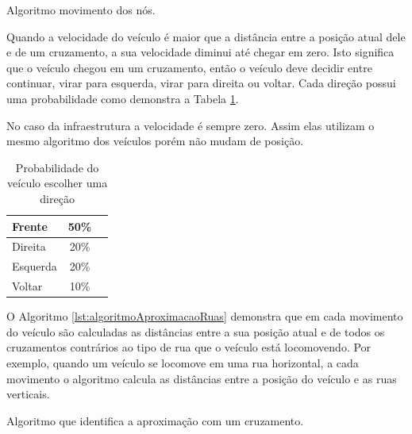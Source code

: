 \begin{algorithm}
	\scriptsize
	\caption{Algoritmo movimento dos nós.}
	\label{lst:algoritmoComportamentoNos}
\end{algorithm} 

Quando a velocidade do veículo é maior que a distância entre a posição atual dele e de um cruzamento, a sua velocidade diminui até chegar em zero. Isto significa que o veículo chegou em um cruzamento, então o veículo deve decidir entre continuar, virar para esquerda, virar para direita ou voltar. Cada direção possui uma probabilidade como demonstra a Tabela \ref{tab:probabilidadeEscolhaDirecao}.

No caso da infraestrutura a velocidade é sempre zero. Assim elas utilizam o mesmo algoritmo dos veículos porém não mudam de posição.

\begin{table}[ht]
	\caption{Probabilidade do veículo escolher uma direção}
	\centering
	\begin{tabular}{ | l | c | r}
		\hline
		Frente & 50\% \\ \hline
		Direita & 20\% \\ \hline
		Esquerda & 20\% \\ \hline
		Voltar & 10\% \\ \hline 
	\end{tabular}
	\label{tab:probabilidadeEscolhaDirecao}
\end{table}

O Algoritmo \ref{lst:algoritmoAproximacaoRuas} demonstra que em cada movimento do veículo são calculadas as distâncias entre a sua posição atual e de todos os cruzamentos contrários ao tipo de rua que o veículo está locomovendo.
Por exemplo, quando um veículo se locomove em uma rua horizontal, a cada movimento o algoritmo calcula as distâncias entre a posição do veículo e as ruas verticais.

\begin{algorithm}
	\scriptsize
	\caption{Algoritmo que identifica a aproximação com um cruzamento.}
	\label{lst:algoritmoAproximacaoRuas}
\end{algorithm}

